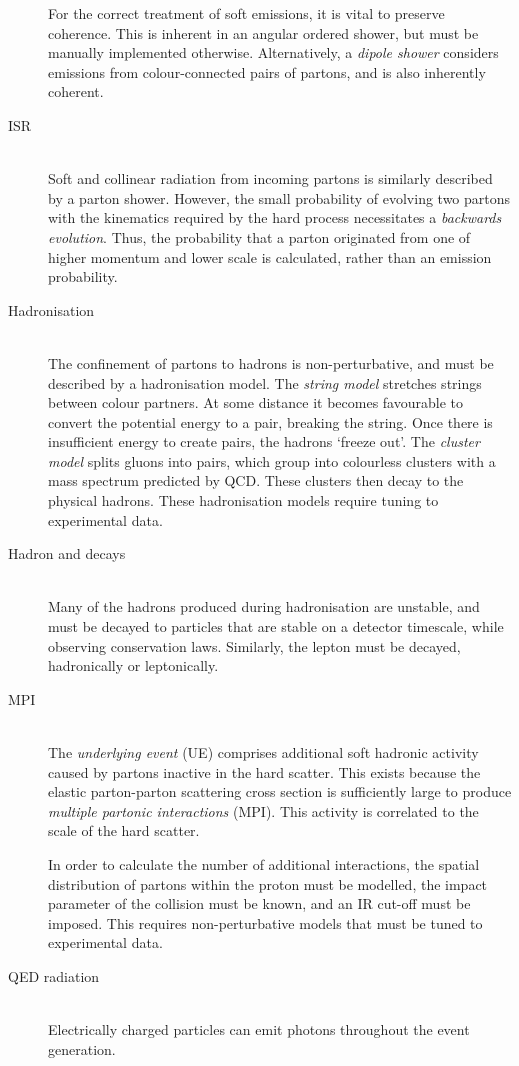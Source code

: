 \begin{description}
	For the correct treatment of soft emissions, it is vital to preserve coherence. This 
	is inherent in an angular ordered shower, but must be manually implemented otherwise. 
	Alternatively, a \textit{dipole shower} considers emissions from colour-connected 
	pairs of partons, and is also inherently coherent.
\item[\ac{ISR}] \hfill \\
	Soft and collinear radiation from incoming partons is similarly described by a parton 
	shower. However, the small probability of evolving two partons with the kinematics 
	required by the hard process necessitates a \textit{backwards evolution}. Thus, the 
	probability that a parton originated from one of higher momentum and lower scale is 
	calculated, rather than an emission probability.
\item[Hadronisation] \hfill \\
	The confinement of partons to hadrons is non-perturbative, and must be described by a 
	hadronisation model. The \textit{string model} stretches strings between colour 
	partners. At some distance it becomes favourable to convert the potential energy to a 
	\HepProcess{\Pquark \APquark} pair, breaking the string. Once there is insufficient 
	energy to create \HepProcess{\Pquark \APquark} pairs, the hadrons `freeze out'. The 
	\textit{cluster model} splits gluons into \HepProcess{\Pquark \APquark} pairs, which 
	group into colourless clusters with a mass spectrum predicted by \ac{QCD}. These 
	clusters then decay to the physical hadrons. These hadronisation models require 
	tuning to experimental data.
\item[Hadron and \Ptau decays] \hfill \\
	Many of the hadrons produced during hadronisation are unstable, and must be decayed to
	particles that are stable on a detector timescale, while observing conservation laws. 
	Similarly, the \Ptau lepton must be decayed, hadronically or leptonically.
\item[\ac{MPI}] \hfill \\
	The \textit{underlying event} (UE) comprises additional soft hadronic activity caused 
	by partons inactive in the hard scatter. This exists because the elastic 
	parton-parton scattering cross section is sufficiently large to produce 
	\textit{multiple partonic interactions} (MPI). This activity is correlated to the 
	scale of the hard scatter. 

	In order to calculate the number of additional interactions, the spatial distribution 
	of partons within the proton must be modelled, the impact parameter of the \pp 
	collision must be known, and an IR cut-off must be imposed. This requires 
	non-perturbative models that must be tuned to experimental data.
\item[\acs{QED} radiation] \hfill \\
	Electrically charged particles can emit photons throughout the event generation.
\end{description}

